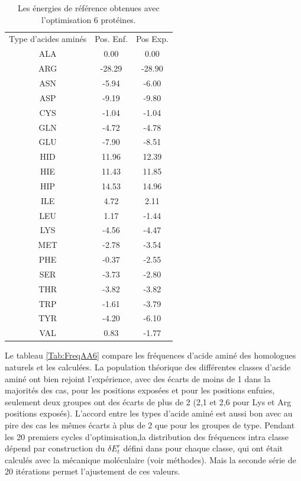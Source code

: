     \begin{table}[!htbp]
      \centering
      \caption{Les énergies de référence obtenues avec l'optimisation 6 protéines.}
      \begin{tabular}{ccc}

        \toprule
        Type d'acides aminés & Pos. Enf. & Pos Exp. \\
        \cmidrule{1-3}

        ALA & 0.00     &  0.00     \\
        ARG & -28.29   &  -28.90   \\
        ASN & -5.94    &  -6.00    \\
        ASP & -9.19    &  -9.80    \\
        CYS & -1.04    &  -1.04    \\
        GLN & -4.72    &  -4.78    \\
        GLU & -7.90    &  -8.51    \\
        HID & 11.96    &  12.39    \\
        HIE & 11.43    &  11.85    \\
        HIP & 14.53    &  14.96    \\
        ILE & 4.72     &  2.11     \\
        LEU & 1.17     &  -1.44    \\
        LYS & -4.56    &  -4.47    \\
        MET & -2.78    &  -3.54    \\
        PHE & -0.37    &  -2.55    \\
        SER & -3.73    &  -2.80    \\
        THR & -3.82    &  -3.82    \\
        TRP & -1.61    &  -3.79    \\
        TYR & -4.20    &  -6.10    \\
        VAL & 0.83     &  -1.77    \\

        \bottomrule
      \end{tabular}      

\label{tab:RefEner6}      
    \end{table}

Le tableau \ref{Tab:FreqAA6} compare les fréquences d'acide aminé des homologues naturels et les calculées. La population théorique des différentes classes d'acide aminé ont bien rejoint l'expérience, avec des écarts de moins de 1 dans la majorités des cas, pour les positions exposées et pour les positions enfuies, seulement deux groupes ont des écarts de plus de 2 (2,1 et 2,6 pour Lys et Arg positions exposés). L'accord entre les types d'acide aminé est aussi bon avec au pire des cas les mêmes écarts à plus de 2 que pour les groupes de type. Pendant les 20 premiers cycles d'optimisation,la distribution des fréquences intra classe dépend par construction du $\delta E_t^r$ défini dans pour chaque classe, qui ont était calculés avec la mécanique moléculaire (voir méthodes). Mais la seconde série de 20 itérations permet l'ajustement de ces valeurs. 

